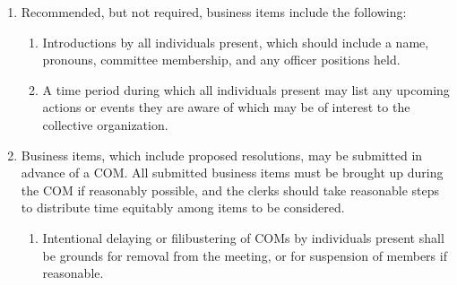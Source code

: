 \documentclass[11pt]{article}
\newcounter{h1}
\newcounter{h2}[h1]
\newcounter{h3}[h2]
\begin{document}
\begin{enumerate}
\begin{enumerate}
    \begin{enumerate}
      \item Any changes to the officer board's composition during the period since the last COM must be reported during officer reports, whether by the voting board of a general or special election or by the officers.  
    \end{enumerate}
    \item Committee reports, during which any information relevant to the collective organization relating to committees' activities must be related by a member of that committee, or by another individual if no such committee member is present.  
    \begin{enumerate}
      \item Any expiration, dissolution, or changes to name, purpose, membership, or lifespan of any committee during the period since the last COM must be reported during committee reports.  
    \end{enumerate}
    \item A period for other business to be conducted, during which any suitable rules of order may be used. This period must last for a minimum of 20 minutes, or until all business is completed, whichever occurs first.  
  \end{enumerate}
  \item Recommended, but not required, business items include the following:  
  \begin{enumerate}
    \item Introductions by all individuals present, which should include a name, pronouns, committee membership, and any officer positions held.  
    \item A time period during which all individuals present may list any upcoming actions or events they are aware of which may be of interest to the collective organization.  
  \end{enumerate}
  \item Business items, which include proposed resolutions, may be submitted in advance of a COM. All submitted business items must be brought up during the COM if reasonably possible, and the clerks should take reasonable steps to distribute time equitably among items to be considered.  
  \begin{enumerate}
    \item Intentional delaying or filibustering of COMs by individuals present shall be grounds for removal from the meeting, or for suspension of members if reasonable.
  \end{enumerate}
\end{enumerate}
\end{document}
